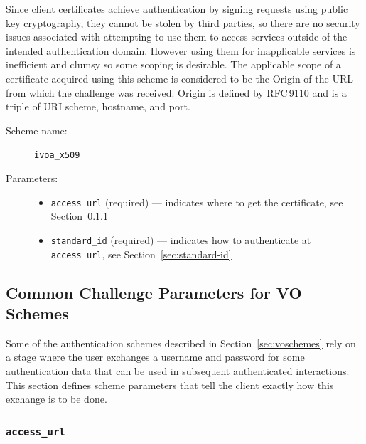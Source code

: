 \documentclass[11pt,a4paper]{ivoa}
\newcommand{\rfc}[1]{RFC\,#1}
\begin{document}
Since client certificates achieve authentication by signing requests
using public key cryptography, they cannot be stolen by third parties,
so there are no security issues associated with attempting to use them
to access services outside of the intended authentication domain.
However using them for inapplicable services is inefficient and clumsy
so some scoping is desirable.
The applicable scope of a certificate acquired using this scheme is
considered to be the Origin of the URL from which
the challenge was received.
Origin is defined by \rfc{9110}
and is a triple of URI scheme, hostname, and port.


\begin{description}
  \item[Scheme name:] \verb|ivoa_x509|
  \item[Parameters:] \mbox{}
  \begin{itemize}
    \item \verb|access_url| (required) ---
          indicates where to get the certificate,
          see Section~\ref{sec:access-url}
    \item \verb|standard_id| (required) ---
          indicates how to authenticate at \verb|access_url|,
          see Section~\ref{sec:standard-id}
  \end{itemize}
\end{description}


\subsection{Common Challenge Parameters for VO Schemes}
\label{sec:common-params}

Some of the authentication schemes described in Section~\ref{sec:voschemes}
rely on a stage where the user exchanges 
a username and password
for some authentication data that can be used in subsequent authenticated
interactions.
This section defines scheme parameters that
tell the client exactly how this exchange is to be done.

\subsubsection{\mbox{\tt access\_url}}
\label{sec:access-url}
\end{document}
